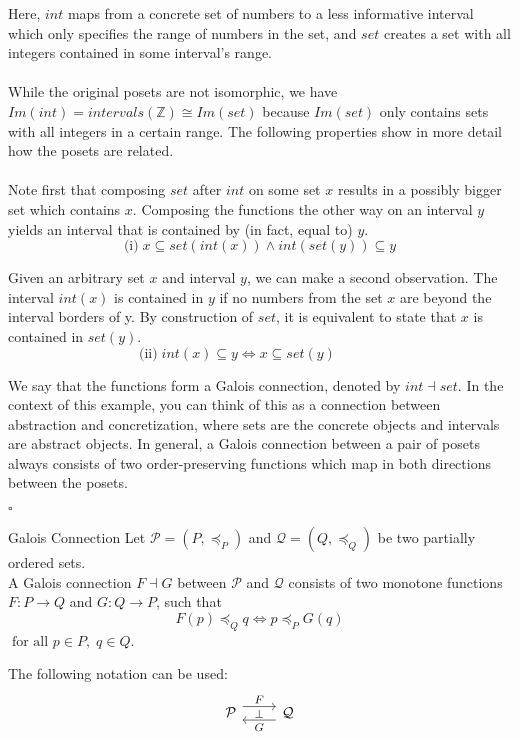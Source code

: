 	Here, $int$ maps from a concrete set of numbers to a less informative interval which only specifies the range of numbers in the set, and $set$ creates a set with all integers contained in some interval's range. \\\\
	While the original posets are not isomorphic, we have $Im(int) = \mathit{intervals}(\mathbb Z) \cong Im(set)$ because $Im(set)$ only contains sets with all integers in a certain range. The following properties show in more detail how the posets are related.\\\\
	Note first that composing $set$ after $int$ on some set $x$ results in a possibly bigger set which contains $x$. Composing the functions the other way on an interval $y$ yields an interval that is contained by (in fact, equal to) $y$.
	\[\text{(i)}\;x \subseteq set(int(x)) \land int(set(y)) \subseteq y\]
	
	Given an arbitrary set $x$ and interval $y$, we can make a second observation. The interval $int(x)$ is contained in $y$ if no numbers from the set $x$ are beyond the interval borders of y. By construction of $set$, it is equivalent to state that $x$ is contained in $set(y)$.	
	\[\text{(ii)}\;int(x) \subseteq y \Leftrightarrow x \subseteq set(y)\;\;\;\;\;\;\;\;\;\;\;\,\]
	 
	We say that the functions form a Galois connection, denoted by  $int \dashv set$.
	  In the context of this example, you can  think of this as a connection between abstraction and concretization, where sets are the concrete objects and intervals are abstract objects. In general, a Galois connection between a pair of posets always consists of two order-preserving functions which map in both directions between the posets. {\begin{flushright}$\square$\end{flushright}}
	\begin{definition}{Galois Connection} 
	Let $\mathcal{P} = (P, \preceq_P)$ and 	$\mathcal{Q} = (Q, \preceq_Q)$ be two partially ordered sets. \\A Galois connection $F \dashv G$ between $\mathcal{P}$ and $\mathcal{Q}$  consists of two monotone functions $F : P \rightarrow Q$ and $G : Q \rightarrow P$, such that 
	\[F(p) \preceq_Q q \Leftrightarrow p \preceq_P G(q)\] $\;\text{for all } p \in P, \; q \in Q$.
	\end{definition} The following notation can be used:
	\[\begin{tikzcd}	
	[ampersand replacement=\&, every label/.append style = {font = \footnotesize}]
	\mathcal{P} \arrow[r, shift left=2,"F","\bot"']
	\& \mathcal{Q} \arrow[l, shift left=2, "G"]
	\end{tikzcd}\]
	
